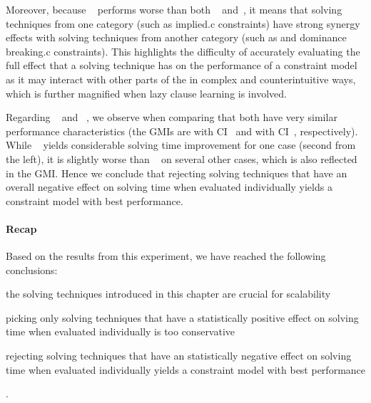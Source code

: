 Moreover, because ~
performs worse than both ~ and~, it means
that solving techniques from one category (such as \gls{implied.c}
\glspl{constraint}) have strong synergy effects with solving techniques from
another category (such as  and \gls{dominance
  breaking.c} \glspl{constraint}).
%
This highlights the difficulty of accurately evaluating the full effect that a
solving technique has on the performance of a \gls{constraint model} as it may
interact with other parts of the  in complex and
counterintuitive ways, which is further magnified when \gls{lazy clause
  learning} is involved.

Regarding ~ and
~, we observe when
comparing  that
both  have very similar performance characteristics
(the \glspl{GMI} are \printGMI{%
  \SolvTechDisableAllBadPrePlusSolvingTimeSpeedupPrePlusSolvingTimeRegularSpeedupGmean%
} with \gls{CI}~\printGMICI{%
  \SolvTechDisableAllBadPrePlusSolvingTimeSpeedupPrePlusSolvingTimeRegularSpeedupCiMin%
}{%
  \SolvTechDisableAllBadPrePlusSolvingTimeSpeedupPrePlusSolvingTimeRegularSpeedupCiMax%
} and \printGMI{%
  \SolvTechDisableAllPrePlusSolvingTimeSpeedupPrePlusSolvingTimeRegularSpeedupGmean%
} with \gls{CI}~\printGMICI{%
  \SolvTechDisableAllPrePlusSolvingTimeSpeedupPrePlusSolvingTimeRegularSpeedupCiMin%
}{%
  \SolvTechDisableAllPrePlusSolvingTimeSpeedupPrePlusSolvingTimeRegularSpeedupCiMax%
}, respectively).
%
While ~ yields considerable
solving time improvement for one case (second from the left), it is slightly
worse than ~ on several
other cases, which is also reflected in the \gls{GMI}.
%
Hence we conclude that rejecting solving techniques that have an overall
negative effect on solving time when evaluated individually yields a
\gls{constraint model} with best performance.


\paragraph{Recap}

Based on the results from this experiment, we have reached the following
conclusions:
%
\begin{enumerate*}[label=(\roman*), itemjoin={;\ }, itemjoin*={; and\ }]
  \item the solving techniques introduced in this chapter are crucial for
    scalability
  \item picking only solving techniques that have a statistically positive
    effect on solving time when evaluated individually is too conservative
  \item rejecting solving techniques that have an statistically negative effect
    on solving time when evaluated individually yields a \gls{constraint model}
    with best performance
\end{enumerate*}.


